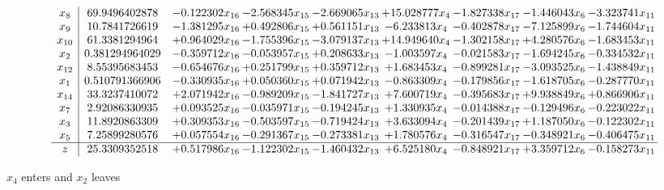 \documentclass[10pt]{article}
\begin{document}
 \[\begin{array}{c| c c@{\hskip 2pt} c@{\hskip 2pt} c@{\hskip 2pt} c@{\hskip 2pt} c@{\hskip 2pt} c@{\hskip 2pt} c@{\hskip 2pt} }
 x_{8}   &  69.9496402878 & -0.122302 x_{16} & -2.568345 x_{15} & -2.669065 x_{13} & + 15.028777 x_{4} & -1.827338 x_{17} & -1.446043 x_{6} & -3.323741 x_{11}\\
 x_{9}   &  10.7841726619 & -1.381295 x_{16} & + 0.492806 x_{15} & + 0.561151 x_{13} & -6.233813 x_{4} & -0.402878 x_{17} & -7.125899 x_{6} & -1.744604 x_{11}\\
 x_{10}   &  61.3381294964 & + 0.964029 x_{16} & -1.755396 x_{15} & -3.079137 x_{13} & + 14.949640 x_{4} & -1.302158 x_{17} & + 4.280576 x_{6} & -1.683453 x_{11}\\
 x_{2}   &  0.381294964029 & -0.359712 x_{16} & -0.053957 x_{15} & + 0.208633 x_{13} & -1.003597 x_{4} & -0.021583 x_{17} & -1.694245 x_{6} & -0.334532 x_{11}\\
 x_{12}   &  8.55395683453 & -0.654676 x_{16} & + 0.251799 x_{15} & + 0.359712 x_{13} & + 1.683453 x_{4} & -0.899281 x_{17} & -3.093525 x_{6} & -1.438849 x_{11}\\
 x_{1}   &  0.510791366906 & -0.330935 x_{16} & + 0.050360 x_{15} & + 0.071942 x_{13} & -0.863309 x_{4} & -0.179856 x_{17} & -1.618705 x_{6} & -0.287770 x_{11}\\
 x_{14}   &  33.3237410072 & + 2.071942 x_{16} & -0.989209 x_{15} & -1.841727 x_{13} & + 7.600719 x_{4} & -0.395683 x_{17} & + 9.938849 x_{6} & + 0.866906 x_{11}\\
 x_{7}   &  2.92086330935 & + 0.093525 x_{16} & -0.035971 x_{15} & -0.194245 x_{13} & + 1.330935 x_{4} & -0.014388 x_{17} & -0.129496 x_{6} & -0.223022 x_{11}\\
 x_{3}   &  11.8920863309 & + 0.309353 x_{16} & -0.503597 x_{15} & -0.719424 x_{13} & + 3.633094 x_{4} & -0.201439 x_{17} & + 1.187050 x_{6} & -0.122302 x_{11}\\
 x_{5}   &  7.25899280576 & + 0.057554 x_{16} & -0.291367 x_{15} & -0.273381 x_{13} & + 1.780576 x_{4} & -0.316547 x_{17} & -0.348921 x_{6} & -0.406475 x_{11}\\
\hline
z    &  25.3309352518 & + 0.517986 x_{16} & -1.122302 x_{15} & -1.460432 x_{13} & + 6.525180 x_{4} & -0.848921 x_{17} & + 3.359712 x_{6} & -0.158273 x_{11}\\
\end{array}\]


 $ x_{4} $ enters and $ x_{2} $ leaves 
\end{document}
